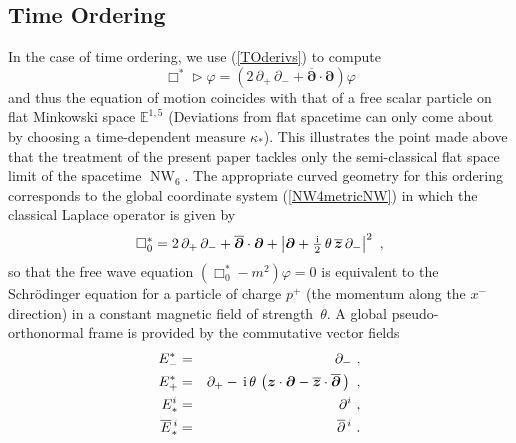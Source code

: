 \documentclass[11pt,a4paper]{article}
\DeclareMathOperator{\NW}{NW}
\def\nn{\nonumber}
\newcommand{\1}{\mathbb{1}}
\newcommand{\mbf}[1]{{\boldsymbol {#1} }}
\def\ii{{\,{\rm i}\,}}
\def\mz{{\mbf z}}
\def\mdell{{\mbf\partial}}
\newcommand{\eucl}{{\mathbb E}}
\def\nn{\nonumber}
\begin{document}
\subsection{Time Ordering\label{ScalarTO}}

In the case of time ordering, we use (\ref{TOderivs}) to compute
\begin{equation}
\Box^*\triangleright\varphi=\left(2\,\partial_+\,\partial_-+
\overline{\mdell}\cdot\mdell\right)\varphi
\label{TOBoxeq}\end{equation}
and thus the equation of motion coincides with that of a free scalar
particle on flat Minkowski space $\eucl^{1,5}$ (Deviations from
flat spacetime can only come about by choosing a time-dependent measure
$\kappa_*$). This illustrates the point made above that the treatment
of the present paper tackles only the semi-classical flat space limit of the
spacetime $\NW_6$. The appropriate curved geometry for this ordering
corresponds to the global coordinate system (\ref{NW4metricNW}) in
which the classical Laplace operator is given by
\begin{equation}
\Box_0^*=2\,\partial_+\,\partial_-+\overline{\mdell}\cdot\mdell+
\left|\mdell+\mbox{$\frac\ii2$}\,\theta\,\overline{\mz}\,
\partial_-\right|^2 \ ,
\label{TOBox0}\end{equation}
so that the free wave equation $(\Box_0^*-m^2)\varphi=0$ is equivalent
to the Schr\"odinger equation for a particle of charge $p^+$ (the
momentum along the $x^-$ direction) in a constant magnetic field
of strength~$\theta$. A global pseudo-orthonormal frame is provided by
the commutative vector fields
\begin{eqnarray}
E_-^*&=&\partial_- \ , \nn\\ E_+^*&=&\partial_+-\ii\theta\,\left(
\mz\cdot\mdell-\overline{\mz}\cdot\overline{\mdell}\,\right) \ ,
\nn\\ E^{i}_*&=&\partial^i \ , \nn\\
\overline{E}{}_{*}^{\,i}&=&\overline{\partial}{}^{\,i} \ .
\label{TOorthoframe}\end{eqnarray}
\end{document}
